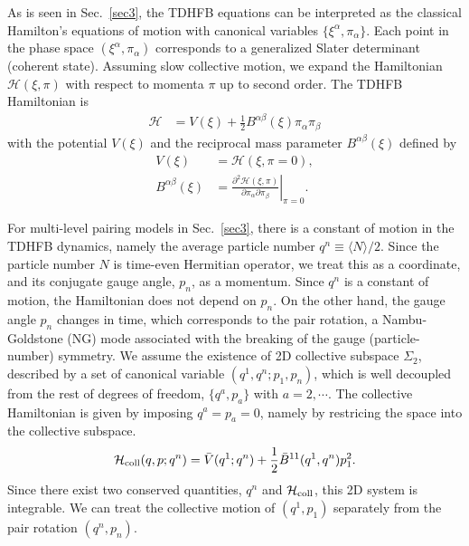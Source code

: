 \documentclass[%
superscriptaddress,
showpacs,
nofootinbib,
amsmath,amssymb,
aps,
prc,
twocolumn,
floatfix ]%
{revtex4-1}
\begin{document}
As is seen in Sec.~\ref{sec3}, the TDHFB equations can be
interpreted as the classical Hamilton's equations of motion
with canonical variables $\{\xi^{\alpha},\pi_{\alpha}\}$. 
Each point in the phase space $(\xi^{\alpha},\pi_{\alpha})$
corresponds to a generalized Slater determinant (coherent state).
Assuming slow collective motion,
we expand the Hamiltonian $\mathcal{H}(\xi,\pi)$ with respect to
momenta $\pi$ up to second order.
The TDHFB Hamiltonian is
\begin{align}
 \mathcal{H} &= V(\xi) + \frac{1}{2}B^{\alpha\beta}(\xi)\pi_{\alpha}\pi_{\beta}
\end{align}
with the potential $V(\xi)$ and
the reciprocal mass parameter $B^{\alpha\beta}(\xi)$ defined by
\begin{align}
  V(\xi) &= \mathcal{H}(\xi,\pi=0) , \\
  B^{\alpha\beta}(\xi) &= \left. \frac{\partial^2\mathcal{H}(\xi,\pi)}{\partial\pi_{\alpha}\partial\pi_{\beta}} \right|_{\pi=0}.
\end{align}

For multi-level pairing models in Sec.~\ref{sec3}, 
there is a constant of motion in the TDHFB dynamics,
namely the average particle number $q^n\equiv \langle N \rangle/2$.
Since the particle number $N$ is time-even Hermitian operator, we treat
this as a coordinate, and its conjugate gauge angle, $p_n$,
as a momentum.
Since $q^n$ is a constant of motion, the Hamiltonian does not
depend on $p_n$.
On the other hand, the gauge angle $p_n$ changes in time,
which corresponds to the pair rotation, a Nambu-Goldstone (NG) mode
associated with the breaking of the gauge (particle-number) symmetry.
We assume the existence of 2D collective subspace $\Sigma_2$,
described by a set of canonical variable $(q^1,q^n;p_1,p_n)$,
which is well decoupled from the rest of degrees of freedom,
$\{q^a,p_a\}$ with $a=2,\cdots$.
The collective Hamiltonian is given by imposing $q^a=p_a=0$,
namely by restricing the space into the collective subspace.
\begin{equation}
\mathcal{H}_{\rm coll}(q,p;q^n)
= \bar{V}(q^1;q^n) + \frac{1}{2}\bar{B}^{11}(q^1,q^n)p_1^2 .
  \label{coll}
\end{equation}
Since there exist two conserved quantities, $q^n$ and $\mathcal{H}_{\rm coll}$,
this 2D system is integrable.
We can treat the collective motion of $(q^1,p_1)$ separately from
the pair rotation $(q^n, p_n)$.
\end{document}
